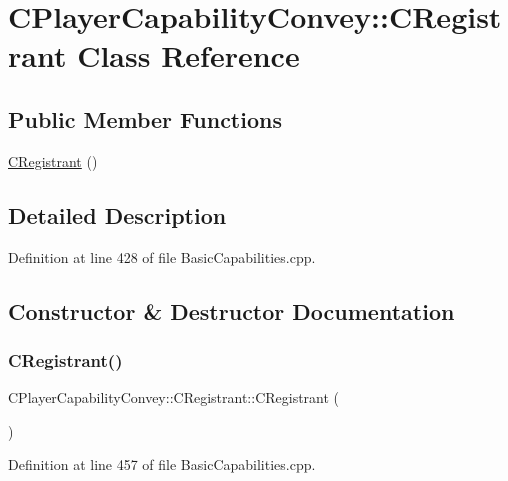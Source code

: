 \hypertarget{classCPlayerCapabilityConvey_1_1CRegistrant}{}\section{C\+Player\+Capability\+Convey\+:\+:C\+Registrant Class Reference}
\label{classCPlayerCapabilityConvey_1_1CRegistrant}
\subsection*{Public Member Functions}
\begin{DoxyCompactItemize}
\item 
\hyperlink{classCPlayerCapabilityConvey_1_1CRegistrant_a7ceb41f660b3b73dff670952658a2883}{C\+Registrant} ()
\end{DoxyCompactItemize}


\subsection{Detailed Description}


Definition at line 428 of file Basic\+Capabilities.\+cpp.



\subsection{Constructor \& Destructor Documentation}
\hypertarget{classCPlayerCapabilityConvey_1_1CRegistrant_a7ceb41f660b3b73dff670952658a2883}{}\label{classCPlayerCapabilityConvey_1_1CRegistrant_a7ceb41f660b3b73dff670952658a2883} 
\subsubsection{\texorpdfstring{C\+Registrant()}{CRegistrant()}}
{\footnotesize\ttfamily C\+Player\+Capability\+Convey\+::\+C\+Registrant\+::\+C\+Registrant (\begin{DoxyParamCaption}{ }\end{DoxyParamCaption})}



Definition at line 457 of file Basic\+Capabilities.\+cpp.


